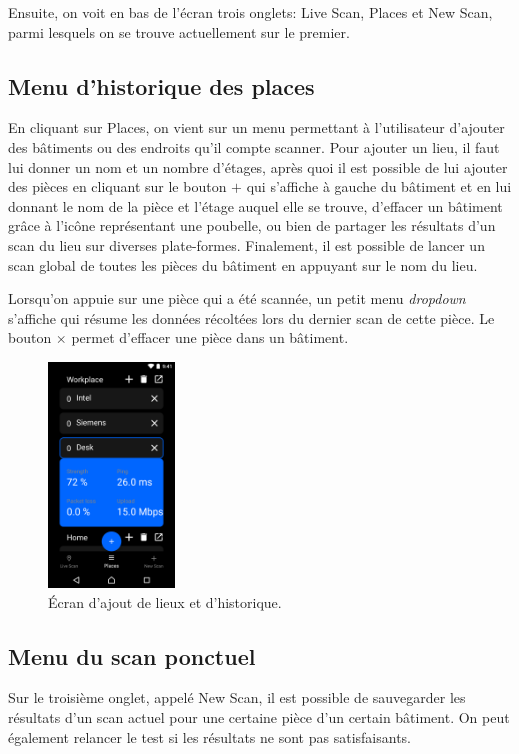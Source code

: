 \documentclass{elsarticle}
\begin{document}
Ensuite, on voit en bas de l'écran trois onglets: \textsf{Live Scan}, \textsf{Places} et \textsf{New Scan}, parmi lesquels on se trouve actuellement sur le premier.

\subsection{Menu d'historique des places}
En cliquant sur \textsf{Places}, on vient sur un menu permettant à l'utilisateur d'ajouter des bâtiments ou des endroits qu'il compte scanner.
Pour ajouter un lieu, il faut lui donner un nom et un nombre d'étages, après quoi il est possible de lui ajouter des pièces en cliquant sur le bouton \og $+$ \fg{} qui s'affiche à gauche du bâtiment et en lui donnant le nom de la pièce et l'étage auquel elle se trouve, d'effacer un bâtiment grâce à l'icône représentant une poubelle, ou bien de partager les résultats d'un scan du lieu sur diverses plate-formes.
Finalement, il est possible de lancer un scan global de toutes les pièces du bâtiment en appuyant sur le nom du lieu.

Lorsqu'on appuie sur une pièce qui a été scannée, un petit menu \textit{dropdown} s'affiche qui résume les données récoltées lors du dernier scan de cette pièce.
Le bouton \og $\times$ \fg{} permet d'effacer une pièce dans un bâtiment.

\begin{figure}[!htbp]
	\centering
	\includegraphics[width=0.3\textwidth]{img/places}
	\caption{Écran d'ajout de lieux et d'historique.}
	\label{fig:places}
\end{figure}

\subsection{Menu du scan ponctuel}
Sur le troisième onglet, appelé \textsf{New Scan}, il est possible de sauvegarder les résultats d'un scan actuel pour une certaine pièce d'un certain bâtiment.
On peut également relancer le test si les résultats ne sont pas satisfaisants.
\end{document}
